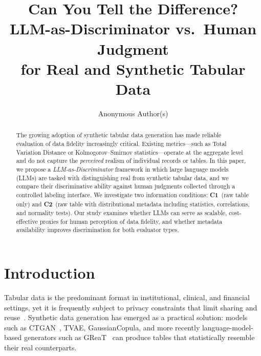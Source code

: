 \documentclass[runningheads]{llncs}
\begin{document}
\title{Can You Tell the Difference? \\
  LLM-as-Discriminator vs.\ Human Judgment \\
  for Real and Synthetic Tabular Data}


\author{Anonymous Author(s)}

\maketitle

\begin{abstract}
The growing adoption of synthetic tabular data generation has made
reliable evaluation of data fidelity increasingly critical.
Existing metrics---such as Total Variation Distance or Kolmogorov--Smirnov
statistics---operate at the aggregate level and do not capture the
\emph{perceived} realism of individual records or tables.
In this paper, we propose a \emph{LLM-as-Discriminator} framework in
which large language models (LLMs) are tasked with distinguishing real
from synthetic tabular data, and we compare their discriminative ability
against human judgments collected through a controlled labeling interface.
We investigate two information conditions: \textbf{C1}~(raw table only)
and \textbf{C2}~(raw table with distributional metadata including
statistics, correlations, and normality tests).
Our study examines whether LLMs can serve as scalable, cost-effective
proxies for human perception of data fidelity, and whether metadata
availability improves discrimination for both evaluator types.
\end{abstract}

\section{Introduction}
\label{sec:intro}

Tabular data is the predominant format in institutional, clinical, and
financial settings, yet it is frequently subject to privacy constraints
that limit sharing and reuse~\cite{jordon2022synthetic}.
Synthetic data generation has emerged as a practical solution:
models such as CTGAN~\cite{xu2019modeling}, TVAE, GaussianCopula,
and more recently language-model-based generators such as
GReaT~\cite{borisov2023language} can produce tables that statistically
resemble their real counterparts.
\end{document}
